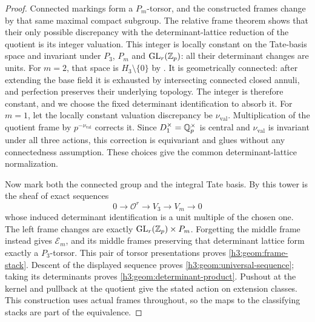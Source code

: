 \begin{proof}
Connected markings form a $P_m$-torsor, and the constructed frames
change by that same maximal compact subgroup.  The relative frame
theorem shows that their only possible discrepancy with the
determinant-lattice reduction of the quotient is its integer
valuation.  This integer is locally constant on the Tate-basis
space and invariant under $P_3$, $P_m$ and $\operatorname{GL}_r(\mathbb Z_p)$:
all their determinant changes are units.  For $m=2$, that
space is $H_3\setminus\{0\}$ by
.  It is geometrically
connected: after extending the base field it is exhausted by
intersecting connected closed annuli, and perfection preserves
their underlying topology.  The integer is therefore constant,
and we choose the fixed determinant identification to absorb it.
For $m=1$, let the locally constant valuation discrepancy be
$\nu_{\mathrm{val}}$.  Multiplication of the quotient frame by
$p^{-\nu_{\mathrm{val}}}$ corrects it.  Since
$D_1^\times=\mathbb Q_p^\times$ is central and $\nu_{\mathrm{val}}$
is invariant under all three actions, this correction is
equivariant and glues without any connectedness assumption.
These choices give the common determinant-lattice normalization.

Now mark both the connected group and the integral Tate basis.
By  this tower is the sheaf of
exact sequences
\[
 0\to\mathcal O^r\to V_3\to V_m\to0
\]
whose induced determinant identification is a unit multiple of the
chosen one.  The left frame changes are exactly
$\operatorname{GL}_r(\mathbb Z_p)\times P_m$.  Forgetting the middle frame instead
gives $\mathcal E_m$, and its middle frames preserving that
determinant lattice form exactly a $P_3$-torsor.  This pair of
torsor presentations proves \eqref{h3:geom:frame-stack}.
Descent of the displayed sequence proves
\eqref{h3:geom:universal-sequence}; taking its determinants proves
\eqref{h3:geom:determinant-product}.  Pushout at the kernel and
pullback at the quotient give the stated action on extension
classes.  This construction uses actual frames throughout, so the
maps to the classifying stacks are part of the equivalence.


\end{proof}
